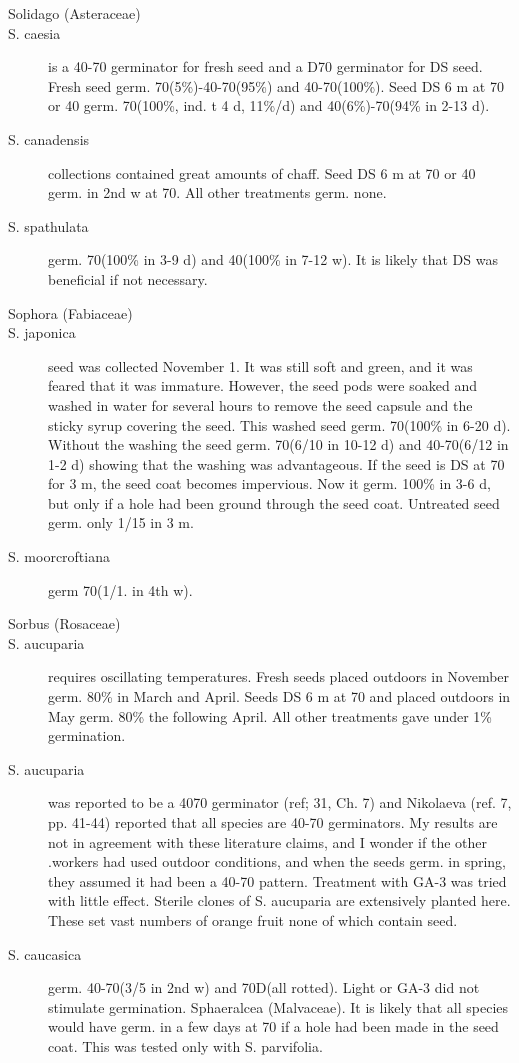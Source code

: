 \begin{description}
\item[Solidago (Asteraceae)]
\item[S. caesia] is a 40-70 germinator for fresh seed and a D70 germinator for DS
seed. Fresh seed germ. 70(5\%)-40-70(95\%) and 40-70(100\%). Seed DS 6 m at 70
or 40 germ. 70(100\%, ind. t 4 d, 11\%/d) and 40(6\%)-70(94\% in 2-13 d).
\item[S. canadensis] collections contained great amounts of chaff. Seed DS 6 m at 70
or 40 germ. in 2nd w at 70. All other treatments germ. none.
\item[S. spathulata] germ. 70(100\% in 3-9 d) and 40(100\% in 7-12 w). It is likely that
DS was beneficial if not necessary.

\item[Sophora (Fabiaceae)]
\item[S. japonica] seed was collected November 1. It was still soft and green, and it
was feared that it was immature. However, the seed pods were soaked and washed in
water for several hours to remove the seed capsule and the sticky syrup covering the
seed. This washed seed germ. 70(100\% in 6-20 d). Without the washing the seed
germ. 70(6/10 in 10-12 d) and 40-70(6/12 in 1-2 d) showing that the washing was
advantageous. If the seed is DS at 70 for 3 m, the seed coat becomes impervious.
Now it germ. 100\% in 3-6 d, but only if a hole had been ground through the seed coat.
Untreated seed germ. only 1/15 in 3 m.
\item[S. moorcroftiana] germ 70(1/1. in 4th w).

\item[Sorbus (Rosaceae)]
\item[S. aucuparia] requires oscillating temperatures. Fresh seeds placed outdoors in
November germ. 80\% in March and April. Seeds DS 6 m at 70 and placed outdoors in
May germ. 80\% the following April. All other treatments gave under 1\% germination.
\item[S. aucuparia] was reported to be a 4070 germinator (ref; 31, Ch. 7) and Nikolaeva (ref.
7, pp. 41-44) reported that all species are 40-70 germinators. My results are not in
agreement with these literature claims, and I wonder if the other .workers had used
outdoor conditions, and when the seeds germ. in spring, they assumed it had been a
40-70 pattern. Treatment with GA-3 was tried with little effect. Sterile clones of S.
aucuparia are extensively planted here. These set vast numbers of orange fruit none
of which contain seed.
\item[S. caucasica] germ. 40-70(3/5 in 2nd w) and 70D(all rotted). Light or GA-3 did
not stimulate germination.
Sphaeralcea (Malvaceae). It is likely that all species would have germ. in
a few days at 70 if a hole had been made in the seed coat. This was tested only with
S. parvifolia.


\end{description}
